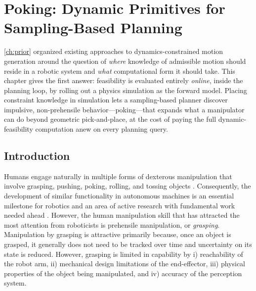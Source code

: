 
\chapter{Poking: Dynamic Primitives for Sampling-Based Planning}
\label{ch:poking}

\cref{ch:prior} organized existing approaches to dynamics-constrained motion generation around the question of \emph{where} knowledge of admissible motion should reside in a robotic system and \emph{what} computational form it should take.
This chapter gives the first answer: feasibility is evaluated entirely \emph{online}, inside the planning loop, by rolling out a physics simulation as the forward model.
Placing constraint knowledge in simulation lets a sampling-based planner discover impulsive, non-prehensile behavior---poking---that expands what a manipulator can do beyond geometric pick-and-place, at the cost of paying the full dynamic-feasibility computation anew on every planning query.

\section{Introduction}
\label{sec:poking:motivation}

Humans engage naturally in multiple forms of dexterous manipulation that involve grasping, pushing, poking, rolling, and tossing objects \cite{bullock2011classifying}.
Consequently, the development of similar functionality in autonomous machines is an essential milestone for robotics and an area of active research with fundamental work needed ahead \cite{billard2019trends}.
However, the human manipulation skill that has attracted the most attention from roboticists is prehensile manipulation, or \textsl{grasping}.
Manipulation by grasping is attractive primarily because, once an object is grasped, it generally does not need to be tracked over time and uncertainty on its state is reduced. However, grasping is limited in capability by i) reachability of the robot arm, ii) mechanical design limitations of the end-effector, iii) physical properties of the object being manipulated, and iv) accuracy of the perception system.


